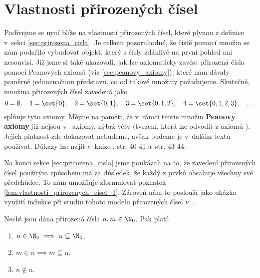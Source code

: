 \section{Vlastnosti přirozených čísel}\label{sec:vlastnosti_prirozenych_cisel}
Podívejme se nyní blíže na vlastnosti přirozených čísel, které plynou z definice v~sekci \ref{sec:prirozena_cisla}. Je celkem pozoruhodné, že čistě pomocí množin se nám podařilo vybudovat objekt, který s čísly zdánlivě na první pohled ani nesouvisí. Již jsme si také ukazovali, jak lze axiomaticky zavést přirozená čísla pomocí Peanových axiomů (viz \ref{sec:peanovy_axiomy}), které nám dávaly poměrně jednoznačnou představu, co od takové množiny požadujeme. Skutečně, množina přirozených čísel zavedená jako
\begin{equation*}
    0=\emptyset,\quad 1=\set{0},\quad 2=\set{0,1},\quad 3=\set{0,1,2},\quad 4=\set{0,1,2,3},\quad\dots
\end{equation*}
splňuje tyto axiomy. Mějme na paměti, že v~rámci teorie množin \textbf{Peanovy axiomy} již nejsou v~\ZF{} axiomy, nýbrž věty (tvrzení, která lze odvodit z axiomů \ZF{}). Jejich platnost zde dokazovat nebudeme, avšak budeme je v~dalším textu používat. Důkazy lze najít v~knize \cite{Goldrei2017}, str. 40-41 a~str. 43-44.\par
Na konci sekce \ref{sec:prirozena_cisla} jsme poukázali na to, že zavedení přirozených čísel použitým způsobem má za důsledek, že každý z prvků obsahuje všechny své předchůdce.
To nám umožňuje zformulovat poznatek \ref{lem:vlastnosti_prirozenych_cisel_1}. Zároveň nám to poslouží jako ukázka využití indukce při studiu tohoto modelu přirozených čísel v~\ZF{}.
\begin{lemma}\label{lem:vlastnosti_prirozenych_cisel_1}
    Nechť jsou dána přirozená čísla $n,m\in\N_0$. Pak platí:
    \begin{enumerate}[label=(\roman*)]
        \item\label{item:vlastnost_1_1} $n\in\N_0\implies n\subseteq\N_0$,
        \item\label{item:vlastnost_1_2} $m\in n\implies m\subseteq n$,
        \item\label{item:vlastnost_1_3} $n\notin n$.
    \end{enumerate}
\end{lemma}
